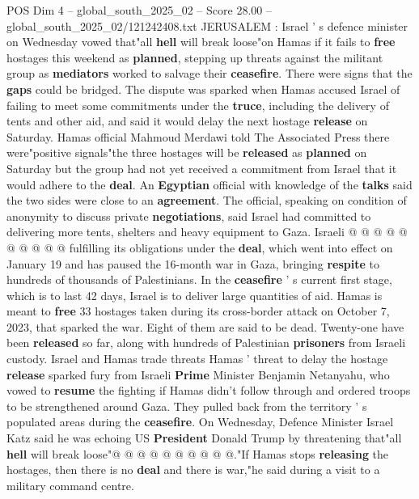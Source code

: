 \begin{textsample}{POS Dim 4 – global\_south\_2025\_02 – Score 28.00 – global\_south\_2025\_02/121242408.txt}  \label{ex:f4_pos_030}
JERUSALEM : Israel ' s defence minister on Wednesday vowed that"all \textbf{hell} will break loose"on Hamas if it fails to \textbf{free} hostages this weekend as \textbf{planned}, stepping up threats against the militant group as \textbf{mediators} worked to salvage their \textbf{ceasefire}.
There were signs that the \textbf{gaps} could be bridged.
The dispute was sparked when Hamas accused Israel of failing to meet some commitments under the \textbf{truce}, including the delivery of tents and other aid, and said it would delay the next hostage \textbf{release} on Saturday.
Hamas official Mahmoud Merdawi told The Associated Press there were"positive signals"the three hostages will be \textbf{released} as \textbf{planned} on Saturday but the group had not yet received a commitment from Israel that it would adhere to the \textbf{deal}.
An \textbf{Egyptian} official with knowledge of the \textbf{talks} said the two sides were close to an \textbf{agreement}.
The official, speaking on condition of anonymity to discuss private \textbf{negotiations}, said Israel had committed to delivering more tents, shelters and heavy equipment to Gaza.
Israeli @ @ @ @ @ @ @ @ @ @ fulfilling its obligations under the \textbf{deal}, which went into effect on January 19 and has paused the 16-month war in Gaza, bringing \textbf{respite} to hundreds of thousands of Palestinians.
In the \textbf{ceasefire} ' s current first stage, which is to last 42 days, Israel is to deliver large quantities of aid.
Hamas is meant to \textbf{free} 33 hostages taken during its cross-border attack on October 7, 2023, that sparked the war.
Eight of them are said to be dead.
Twenty-one have been \textbf{released} so far, along with hundreds of Palestinian \textbf{prisoners} from Israeli custody.
Israel and Hamas trade threats Hamas ' threat to delay the hostage \textbf{release} sparked fury from Israeli \textbf{Prime} Minister Benjamin Netanyahu, who vowed to \textbf{resume} the fighting if Hamas didn't follow through and ordered troops to be strengthened around Gaza.
They pulled back from the territory ' s populated areas during the \textbf{ceasefire}.
On Wednesday, Defence Minister Israel Katz said he was echoing US \textbf{President} Donald Trump by threatening that"all \textbf{hell} will break loose"@ @ @ @ @ @ @ @ @ @."If Hamas stops \textbf{releasing} the hostages, then there is no \textbf{deal} and there is war,"he said during a visit to a military command centre.

\end{textsample}
